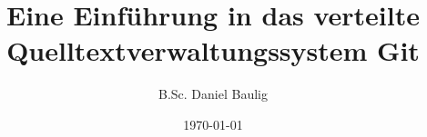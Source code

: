 \usepackage[utf8]{inputenc}
\usepackage[ngerman]{babel}

\title[Git Einführung]{Eine Einführung in das verteilte Quelltextverwaltungssystem Git}
\author[D. Baulig]{B.Sc. Daniel Baulig}
\date{\today}


